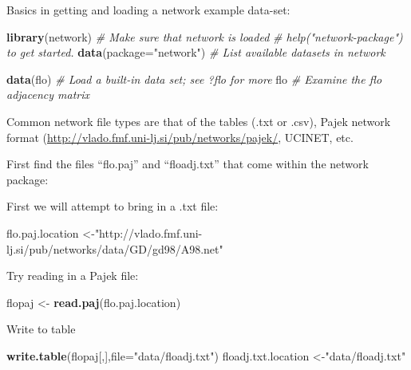 \documentclass[]{book}
\newenvironment{Shaded}{\begin{snugshade}}{\end{snugshade}}
\newcommand{\KeywordTok}[1]{\textcolor[rgb]{0.13,0.29,0.53}{\textbf{{#1}}}}
\newcommand{\DataTypeTok}[1]{\textcolor[rgb]{0.13,0.29,0.53}{{#1}}}
\newcommand{\StringTok}[1]{\textcolor[rgb]{0.31,0.60,0.02}{{#1}}}
\newcommand{\CommentTok}[1]{\textcolor[rgb]{0.56,0.35,0.01}{\textit{{#1}}}}
\newcommand{\NormalTok}[1]{{#1}}
\theoremstyle{definition}
\theoremstyle{definition}
\theoremstyle{definition}
\theoremstyle{remark}
\let\BeginKnitrBlock\begin \let\EndKnitrBlock\end
\begin{document}
Basics in getting and loading a network example data-set:

\begin{Shaded}
\begin{Highlighting}[]
\KeywordTok{library}\NormalTok{(network)       }\CommentTok{# Make sure that network is loaded}
\CommentTok{# help("network-package") to get started.}
\KeywordTok{data}\NormalTok{(}\DataTypeTok{package=}\StringTok{"network"}\NormalTok{) }\CommentTok{# List available datasets in network}

\KeywordTok{data}\NormalTok{(flo)      }\CommentTok{# Load a built-in data set; see ?flo for more}
\NormalTok{flo          }\CommentTok{# Examine the flo adjacency matrix}
\end{Highlighting}
\end{Shaded}

\BeginKnitrBlock{example}
\protect\hypertarget{exm:unnamed-chunk-23}{}{\label{exm:unnamed-chunk-23}
}Common network file types are that of the tables (.txt or .csv), Pajek
network format (\url{http://vlado.fmf.uni-lj.si/pub/networks/pajek/},
UCINET, etc.
\EndKnitrBlock{example}

First find the files ``flo.paj'' and ``floadj.txt'' that come within the
network package:

First we will attempt to bring in a .txt file:

\begin{Shaded}
\begin{Highlighting}[]
 \NormalTok{flo.paj.location <-}\StringTok{"http://vlado.fmf.uni-lj.si/pub/networks/data/GD/gd98/A98.net"}
\end{Highlighting}
\end{Shaded}

Try reading in a Pajek file:

\begin{Shaded}
\begin{Highlighting}[]
\NormalTok{flopaj <-}\StringTok{ }\KeywordTok{read.paj}\NormalTok{(flo.paj.location)}
\end{Highlighting}
\end{Shaded}

Write to table

\begin{Shaded}
\begin{Highlighting}[]
\KeywordTok{write.table}\NormalTok{(flopaj[,],}\DataTypeTok{file=}\StringTok{"data/floadj.txt"}\NormalTok{)}
\NormalTok{floadj.txt.location <-}\StringTok{"data/floadj.txt"}
\end{Highlighting}
\end{Shaded}
\end{document}
